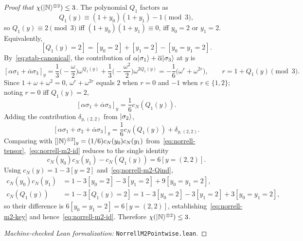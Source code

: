\documentclass[11pt]{article}
\theoremstyle{definition}
\newcommand{\microspace}{\mspace{0.5mu}}
\newcommand{\ket}[1]{\lvert\microspace #1 \microspace \rangle}
\newcommand{\chiR}{\chi}
\newcommand{\Norrell}{\ket{\mathbb{N}}}
\begin{document}
\begin{proof}[Proof that $\chiR(\Norrell^{\otimes 2}) \le 3$]
		The polynomial $Q_1$ factors as
		\begin{equation}\label{eq:norrell-m2-Qfactor}
			Q_1(y) \equiv (1 + y_0)(1 + y_1) - 1 \pmod 3,
		\end{equation}
		so $Q_1(y) \equiv 2 \pmod 3$ iff $(1 + y_0)(1 + y_1) \equiv 0$, iff
		$y_0 = 2$ or $y_1 = 2$. Equivalently,
		\begin{equation}\label{eq:norrell-m2-Qind}
			[Q_1(y) = 2] = [y_0 = 2] + [y_1 = 2] - [y_0 = y_1 = 2].
		\end{equation}
		By~\eqref{eq:stab-canonical}, the contribution of
		$\alpha \ket{\sigma_1} + \overline{\alpha} \ket{\sigma_3}$ at $y$ is
		\begin{equation}\label{eq:norrell-m2-S13}
			[\alpha \sigma_1 + \overline{\alpha} \sigma_3]_y
			= \frac{1}{3}\big(-\frac{\omega}{2}\big) \omega^{Q_1(y)}
			+ \frac{1}{3}\big(-\frac{\omega^2}{2}\big) \omega^{2 Q_1(y)}
			= -\frac{1}{6} \big( \omega^{r} + \omega^{2 r} \big),
			\qquad r = 1 + Q_1(y) \pmod 3.
		\end{equation}
		Since $1 + \omega + \omega^2 = 0$, $\omega^r + \omega^{2 r}$ equals
		$2$ when $r = 0$ and $-1$ when $r \in \{1, 2\}$; noting $r = 0$ iff
		$Q_1(y) = 2$,
		\begin{equation}\label{eq:norrell-m2-S13-cN}
			[\alpha \sigma_1 + \overline{\alpha} \sigma_3]_y = \frac{1}{6}  c_N(Q_1(y)).
		\end{equation}
		Adding the contribution $\delta_{y, (2,2)}$ from $\ket{\sigma_2}$,
		\begin{equation}\label{eq:norrell-m2-sum}
			[\alpha \sigma_1 + \sigma_2 + \overline{\alpha} \sigma_3]_y
			= \frac{1}{6}  c_N(Q_1(y)) + \delta_{y, (2, 2)}.
		\end{equation}
		Comparing with $[\Norrell^{\otimes 2}]_y = (1/6)c_N(y_0) c_N(y_1)$
		from~\eqref{eq:norrell-tensor},~\eqref{eq:norrell-m2-id} reduces to the
		single identity
		\begin{equation}\label{eq:norrell-m2-key}
			c_N(y_0)  c_N(y_1) - c_N(Q_1(y)) = 6  [y = (2, 2)].
		\end{equation}
		Using $c_N(y) = 1 - 3 [y = 2]$ and~\eqref{eq:norrell-m2-Qind},
		\begin{align}
			c_N(y_0) c_N(y_1) &= 1 - 3 [y_0 = 2] - 3 [y_1 = 2]
			+ 9  [y_0 = y_1 = 2], \\
			c_N(Q_1(y))       &= 1 - 3  [Q_1(y) = 2]
			= 1 - 3 [y_0 = 2] - 3 [y_1 = 2]
			+ 3  [y_0 = y_1 = 2],
		\end{align}
		so their difference is $6  [y_0 = y_1 = 2] = 6  [y = (2,2)]$,
		establishing~\eqref{eq:norrell-m2-key} and
		hence~\eqref{eq:norrell-m2-id}. Therefore
		$\chiR(\Norrell^{\otimes 2}) \le 3$.

		\textit{Machine-checked Lean formalization:}
		\texttt{NorrellM2Pointwise.lean}.
	\end{proof}
	
\end{document}
